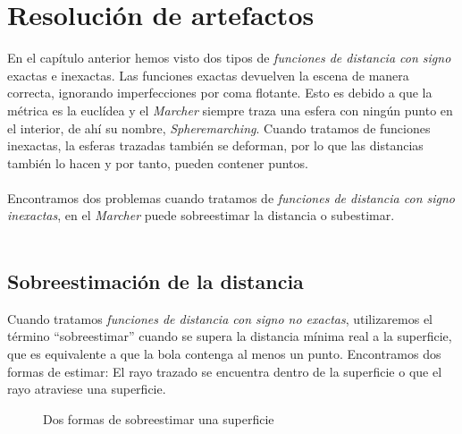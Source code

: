 \chapter{Resolución de artefactos}
En el capítulo anterior hemos visto dos tipos de \textit{funciones de distancia con signo} exactas e inexactas. Las funciones exactas devuelven la escena de manera correcta, ignorando imperfecciones por coma flotante. Esto es debido a que la métrica es la euclídea y el \textit{Marcher} siempre traza una esfera con ningún punto en el interior, de ahí su nombre, \textit{Spheremarching}. Cuando tratamos de funciones inexactas, la esferas trazadas también se deforman, por lo que las distancias también lo hacen y por tanto, pueden contener puntos. \\\\
Encontramos dos problemas cuando tratamos de \textit{funciones de distancia con signo inexactas}, en el \textit{Marcher} puede sobreestimar la distancia o subestimar. \\\\

\section{Sobreestimación de la distancia}
Cuando tratamos \textit{funciones de distancia con signo no exactas}, utilizaremos el término \enquote{sobreestimar} cuando se supera la distancia mínima real a la superficie, que es equivalente a que la bola contenga al menos un punto. Encontramos dos formas de  estimar: El rayo trazado se encuentra dentro de la superficie o que el rayo atraviese una superficie. 

\begin{figure}[H]
  \centering
  \hfill
  \captionsetup{justification=centering}%
  \caption{Dos formas de sobreestimar una superficie}
\end{figure}

